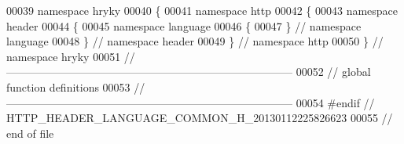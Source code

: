 \begin{DoxyCode}
00039 \textcolor{keyword}{namespace }hryky
00040 \{
00041 \textcolor{keyword}{namespace }http
00042 \{
00043 \textcolor{keyword}{namespace }header
00044 \{
00045 \textcolor{keyword}{namespace }language
00046 \{
00047 \} \textcolor{comment}{// namespace language}
00048 \} \textcolor{comment}{// namespace header}
00049 \} \textcolor{comment}{// namespace http}
00050 \} \textcolor{comment}{// namespace hryky}
00051 \textcolor{comment}{//
      ------------------------------------------------------------------------------}
00052 \textcolor{comment}{// global function definitions}
00053 \textcolor{comment}{//
      ------------------------------------------------------------------------------}
00054 \textcolor{preprocessor}{#endif // HTTP\_HEADER\_LANGUAGE\_COMMON\_H\_20130112225826623}
00055 \textcolor{preprocessor}{}\textcolor{comment}{// end of file}
\end{DoxyCode}
